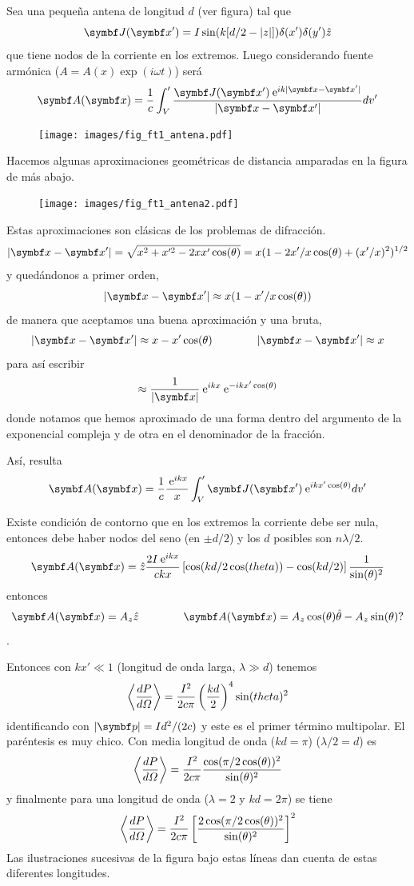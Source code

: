 \documentclass[10pt,oneside]{CBFT_book}
\begin{document}
Sea una pequeña antena de longitud $d$ (ver figura) tal que 
\[
	\vb{J}(\vb{x}') = I \sin( k[d/2 - |z|] ) \delta(x') \delta(y')  \hat{z}
\]
que tiene nodos de la corriente en los extremos. Luego considerando fuente armónica ($A=A(x)\exp(i\omega t)$)
será
\[
	\vb{A}(\vb{x}) = \frac{1}{c} \int_V' \frac{ \vb{J}(\vb{x}') \euler^{ i k |\vb{x}-\vb{x}'| }}
	{ |\vb{x}-\vb{x}'| } dv'
\]

\begin{figure}[htb]
	\begin{center}
	\texttt{[image: images/fig\_ft1\_antena.pdf]}	 
	\end{center}
	\caption{}
\end{figure} 

Hacemos algunas aproximaciones geométricas de distancia amparadas en la figura de más abajo.
	\begin{figure}[htb]
		\begin{center}
		\texttt{[image: images/fig\_ft1\_antena2.pdf]}	 
		\end{center}
		\caption{}
	\end{figure} 

Estas aproximaciones son clásicas de los problemas de difracción.
\[
	|\vb{x}-\vb{x}'| = \sqrt{ x^2 + x'^2 - 2xx'\cos(\theta)} =  
	x( 1 - 2x'/x \cos(\theta) + (x'/x)^2)^{1/2} 
\]
y quedándonos a primer orden,
\[
	|\vb{x}-\vb{x}'|\approx x (1 - x'/x \cos(\theta))
\]
de manera que aceptamos una buena aproximación y una bruta,
\[
	|\vb{x}-\vb{x}'| \approx x - x' \cos( \theta ) \qquad \qquad |\vb{x}-\vb{x}'| \approx x
\]
para así escribir
\[
	\approx \frac{1}{|\vb{x}|} \euler^{ikx} \euler^{-ikx'\cos(\theta)}
\]
donde notamos que hemos aproximado de una forma dentro del argumento de la exponencial compleja
y de otra en el denominador de la fracción.

Así, resulta
\[
	\vb{A}(\vb{x}) = \frac{1}{c} \frac{\euler^{ i k x} }{x} \int_V' \vb{J}(\vb{x}') 
		\euler^{ i k x' \cos(\theta) } dv'
\]

Existe condición de contorno que en los extremos la corriente debe ser nula, entonces debe haber nodos
del seno (en $\pm d/2$) y los $d$ posibles son $ n\lambda/2$.
\[
	\vb{A}(\vb{x}) = \hat{z} \frac{2I\euler^{ikx}}{ckx}\left[ \cos( kd/2 \cos(theta) )- 
		\cos( kd/2 ) \right]\frac{1}{\sin(\theta)^2}
\]
entonces 
\[
	\vb{A}(\vb{x}) = A_z \hat{z} \qquad \qquad \vb{A}(\vb{x}) =  A_z\cos(\theta)\hat{\theta} - 
		A_z\sin(\theta) ?
\]
.

Entonces con $ kx' \ll 1$ (longitud de onda larga, $\lambda \gg d $) tenemos
\[
	\left\langle\frac{d^{\hspace{-0.05em}} {P}}{d {\Omega}^{\hspace{-0.05em}}}\right\rangle = \frac{I^2}{2c\pi}\left( \frac{kd}{2} \right)^4 
		\sin(theta)^2
\]
identificando con $|\vb{p}| = Id^2/(2c)$ y este es el primer término multipolar. El paréntesis es muy
chico.
Con media longitud de onda ($kd=\pi$) ($\lambda/2=d$) es
\[
	\left\langle\frac{d^{\hspace{-0.05em}} {P}}{d {\Omega}^{\hspace{-0.05em}}}\right\rangle=\frac{I^2}{2c\pi}\frac{\cos(\pi/2 
	\cos(\theta))^2}{\sin(\theta)^2}
\]
y finalmente para una longitud de onda ($\lambda=2$ y $kd=2\pi$) se tiene 
\[
	\left\langle\frac{d^{\hspace{-0.05em}} {P}}{d {\Omega}^{\hspace{-0.05em}}}\right\rangle=\frac{I^2}{2c\pi} \left[ \frac{ 2\cos(\pi/2 
	\cos(\theta))^2}{\sin(\theta)^2} \right]^2
\]
Las ilustraciones sucesivas de la figura bajo estas líneas dan cuenta de estas diferentes longitudes.
\end{document}
